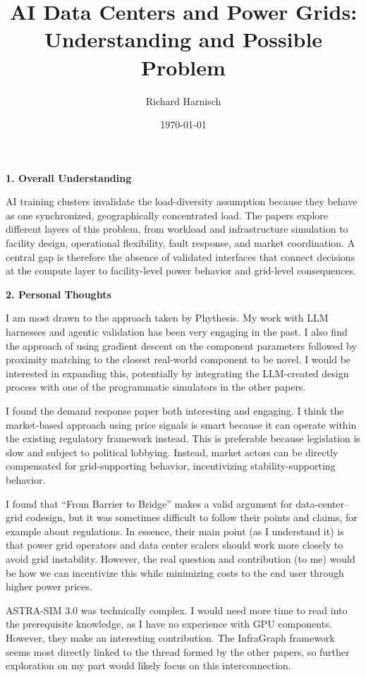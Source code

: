 \documentclass[10pt,a4paper]{article}
\title{\vspace{-1.5em}\large\textbf{AI Data Centers and Power Grids: Understanding and Possible Problem}}
\author{\small Richard Harnisch}
\date{\small \today}
\newcommand{\heading}[1]{\vspace{3pt}\textbf{#1}\par}
\begin{document}
\maketitle
\vspace{-1.5em}

\heading{1. Overall Understanding}
AI training clusters invalidate the load-diversity assumption because they behave as one synchronized, geographically concentrated load. The papers explore different layers of this problem, from workload and infrastructure simulation to facility design, operational flexibility, fault response, and market coordination. A central gap is therefore the absence of validated interfaces that connect decisions at the compute layer to facility-level power behavior and grid-level consequences.

\heading{2. Personal Thoughts}
I am most drawn to the approach taken by Phythesis. My work with LLM harnesses and agentic validation has been very engaging in the past. I also find the approach of using gradient descent on the component parameters followed by proximity matching to the closest real-world component to be novel. I would be interested in expanding this, potentially by integrating the LLM-created design process with one of the programmatic simulators in the other papers.

I found the demand response paper both interesting and engaging. I think the market-based approach using price signals is smart because it can operate within the existing regulatory framework instead. This is preferable because legislation is slow and subject to political lobbying. Instead, market actors can be directly compensated for grid-supporting behavior, incentivizing stability-supporting behavior.

I found that ``From Barrier to Bridge'' makes a valid argument for data-center--grid codesign, but it was sometimes difficult to follow their points and claims, for example about regulations. In essence, their main point (as I understand it) is that power grid operators and data center scalers should work more closely to avoid grid instability. However, the real question and contribution (to me) would be how we can incentivize this while minimizing costs to the end user through higher power prices.

ASTRA-SIM 3.0 was technically complex. I would need more time to read into the prerequisite knowledge, as I have no experience with GPU components. However, they make an interesting contribution. The InfraGraph framework seems most directly linked to the thread formed by the other papers, so further exploration on my part would likely focus on this interconnection.
\end{document}
